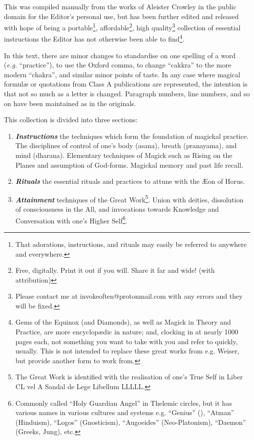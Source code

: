This was compiled manually from the works of Aleister Crowley in the public domain for the Editor's personal use, but has been further edited and released with hope of being a portable\footnote{That adorations, instructions, and rituals may easily be referred to anywhere and everywhere.}, affordable\footnote{Free\footnotemark, digitally. Print it out if you will. Share it far and wide! (with attribution)}, high quality\footnote{Please contact me at invokeoften@protonmail.com with any errors and they will be fixed.\footnotemark} collection of essential instructions the Editor has not otherwise been able to find\footnote{Gems of the Equinox (and Diamonds), as well as Magick in Theory and Practice, are more encyclop\ae{}dic in nature; and, clocking in at nearly 1000 pages each, not something you want to take with you and refer to quickly, usually. This is not intended to replace these great works from e.g. Weiser, but provide another form to work from.}.

In this text, there are minor changes to standardise on one spelling of a word (\textit{e.g.} \enquote{practice}), to use the Oxford comma, to change \enquote{cakkra} to the more modern \enquote{chakra}, and similar minor points of taste. In any case where magical formul\ae{} or quotations from Class A publications are represented, the intention is that not so much as a letter is changed. Paragraph numbers, line numbers, and so on have been maintained as in the originals.

This collection is divided into three sections:

\begin{enumerate}[label=\greek*]
\item \textbf{\textit{Instructions}} \textemdash{} the techniques which form the foundation of magickal practice. The disciplines of control of one's body (asana), breath (pranayama), and mind (dharana). Elementary techniques of Magick such as Rising on the Planes and assumption of God-forms. Magickal memory and past life recall.
\item \textbf{\textit{Rituals}} \textemdash{} the essential rituals and practices to attune with the \AE{}on of Horus.
\item \textbf{\textit{Attainment}} \textemdash{} techniques of the Great Work\footnote{The Great Work is identified with the realisation of one's True Self in Liber CL vel  A Sandal de Lege Libellum L\textendash{}L\textendash{}L\textendash{}L\textendash{}L.}. Union with deities, dissolution of consciousness in the All, and invocations towards Knowledge and Conversation with one's Higher Self\footnote{Commonly called \enquote{Holy Guardian Angel} in Thelemic circles, but it has various names in various cultures and systems e.g. \enquote{Genius} (\GD{}), \enquote{Atman} (Hinduism), \enquote{Logos} (Gnosticism), \enquote{Augoeides} (Neo-Platonism), \enquote{Daemon} (Greeks, Jung), etc.}.
\end{enumerate}

